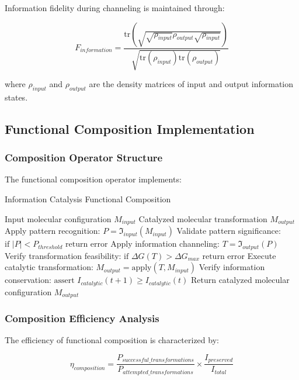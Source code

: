 Information fidelity during channeling is maintained through:

\begin{equation}
F_{information} = \frac{\text{tr}(\sqrt{\sqrt{\rho_{input}} \rho_{output} \sqrt{\rho_{input}}})}{\sqrt{\text{tr}(\rho_{input}) \text{tr}(\rho_{output})}}
\end{equation}

where $\rho_{input}$ and $\rho_{output}$ are the density matrices of input and output information states.

\subsection{Functional Composition Implementation}

\subsubsection{Composition Operator Structure}

The functional composition operator implements:

\begin{algorithm}[H]
\caption{Information Catalysis Functional Composition}
\begin{algorithmic}[1]
\REQUIRE Input molecular configuration $M_{input}$
\ENSURE Catalyzed molecular transformation $M_{output}$
\STATE Apply pattern recognition: $P = \mathfrak{I}_{input}(M_{input})$
\STATE Validate pattern significance: $\text{if } |P| < P_{threshold} \text{ return error}$
\STATE Apply information channeling: $T = \mathfrak{I}_{output}(P)$
\STATE Verify transformation feasibility: $\text{if } \Delta G(T) > \Delta G_{max} \text{ return error}$
\STATE Execute catalytic transformation: $M_{output} = \text{apply}(T, M_{input})$
\STATE Verify information conservation: $\text{assert } I_{catalytic}(t+1) \geq I_{catalytic}(t)$
\STATE Return catalyzed molecular configuration $M_{output}$
\end{algorithmic}
\end{algorithm}

\subsubsection{Composition Efficiency Analysis}

The efficiency of functional composition is characterized by:

\begin{equation}
\eta_{composition} = \frac{P_{successful\_transformations}}{P_{attempted\_transformations}} \times \frac{I_{preserved}}{I_{total}}
\end{equation}

